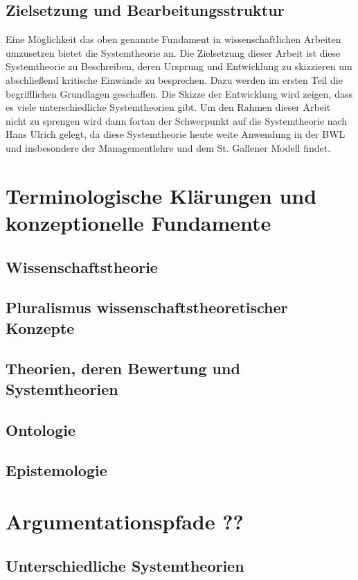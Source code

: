 \documentclass[a4paper,12pt]{article}
\begin{document}
\subsection{Zielsetzung und Bearbeitungsstruktur}
Eine Möglichkeit das oben genannte Fundament in wissenschaftlichen Arbeiten umzusetzen bietet die Systemtheorie an. Die Zielsetzung dieser Arbeit ist diese Systemtheorie zu Beschreiben, deren Ursprung und Entwicklung zu skizzieren um abschließend kritische Einwände zu besprechen. Dazu werden im ersten Teil die begrifflichen Grundlagen geschaffen. Die Skizze der Entwicklung wird zeigen, dass es viele unterschiedliche Systemtheorien gibt. Um den Rahmen dieser Arbeit nicht zu sprengen wird dann fortan der Schwerpunkt auf die Systemtheorie nach Hans Ulrich gelegt, da diese Systemtheorie heute weite Anwendung in der BWL und insbesondere der Managementlehre und dem St. Gallener Modell findet.


\section{Terminologische Klärungen und konzeptionelle Fundamente}
\subsection{Wissenschaftstheorie}
\subsection{Pluralismus wissenschaftstheoretischer Konzepte}
\subsection{Theorien, deren Bewertung und Systemtheorien}
\subsection{Ontologie}
\subsection{Epistemologie}


\section{Argumentationspfade ??}
\subsection{Unterschiedliche Systemtheorien}
\end{document}
